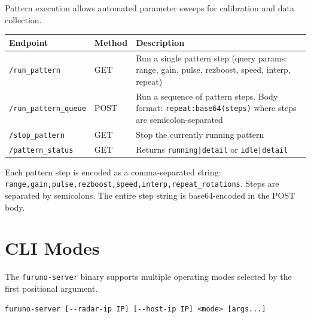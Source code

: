 \documentclass[11pt,letterpaper]{article}
\begin{document}
Pattern execution allows automated parameter sweeps for calibration and data collection.

\begin{longtable}{@{}llp{7cm}@{}}
\toprule
\textbf{Endpoint} & \textbf{Method} & \textbf{Description} \\
\midrule
\endhead
\texttt{/run\_pattern} & GET & Run a single pattern step (query params: range, gain, pulse, rezboost, speed, interp, repeat) \\
\texttt{/run\_pattern\_queue} & POST & Run a sequence of pattern steps. Body format: \texttt{repeat:base64(steps)} where steps are semicolon-separated \\
\texttt{/stop\_pattern} & GET & Stop the currently running pattern \\
\texttt{/pattern\_status} & GET & Returns \texttt{running|detail} or \texttt{idle|detail} \\
\bottomrule
\end{longtable}

Each pattern step is encoded as a comma-separated string: \texttt{range,gain,pulse,rezboost,speed,interp,repeat\_rotations}. Steps are separated by semicolons. The entire step string is base64-encoded in the POST body.


\section{CLI Modes}

The \texttt{furuno-server} binary supports multiple operating modes selected by the first positional argument.

\begin{lstlisting}
furuno-server [--radar-ip IP] [--host-ip IP] <mode> [args...]
\end{lstlisting}
\end{document}
